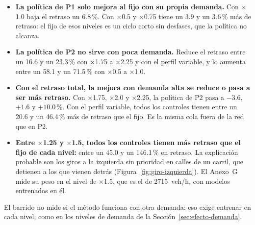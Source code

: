 \begin{itemize}
  \item \textbf{La política de P1 solo mejora al fijo con su propia
    demanda.} Con $\times$1.0 baja el retraso un 6.8\,\%. Con
    $\times$0.5 y $\times$0.75 tiene un 3.9 y un 3.6\,\% más de
    retraso: el fijo de esos niveles es un ciclo corto sin desfases, que
    la política no alcanza.
  \item \textbf{La política de P2 no sirve con poca demanda.} Reduce el
    retraso entre un 16.6 y un 23.3\,\% con $\times$1.75 a $\times$2.25
    y con el perfil variable, y lo aumenta entre un 58.1 y un 71.5\,\%
    con $\times$0.5 a $\times$1.0.
  \item \textbf{Con el retraso total, la mejora con demanda alta se
    reduce o pasa a ser más retraso.} Con $\times$1.75, $\times$2.0 y
    $\times$2.25, la política de P2 pasa a $-3.6$, $+1.6$ y
    $+10.0$\,\%. Con el perfil variable, todos los controles tienen
    entre un 20.6 y un 46.4\,\% más de retraso que el fijo. Es la misma
    cola fuera de la red que en P2.
  \item \textbf{Entre $\times$1.25 y $\times$1.5, todos los controles
    tienen más retraso que el fijo de cada nivel:} entre un 45.0 y un
    146.1\,\% en retraso. La
    explicación probable son los giros a la izquierda sin prioridad en
    calles de un carril, que detienen a los que vienen detrás
    (Figura~\ref{fig:giro-izquierda}). El Anexo~G mide su peso en el
    nivel de $\times$1.5, que es el de 2715~veh/h, con modelos
    entrenados en él.
\end{itemize}
El barrido no mide si el método funciona con otra demanda: eso exige
entrenar en cada nivel, como en los niveles de demanda de la
Sección~\ref{sec:efecto-demanda}.
